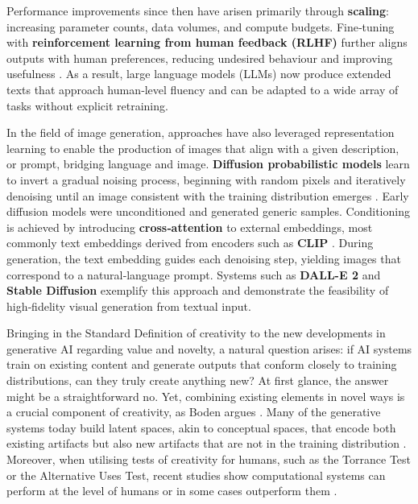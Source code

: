 Performance improvements since then have arisen primarily through \textbf{scaling}: increasing parameter counts, data volumes, and compute budgets. Fine‑tuning with \textbf{reinforcement learning from human feedback (RLHF)} further aligns outputs with human preferences, reducing undesired behaviour and improving usefulness \cite{Ouyang2022-af}. As a result, large language models (LLMs) now produce extended texts that approach human‑level fluency and can be adapted to a wide array of tasks without explicit retraining.

In the field of image generation, approaches have also leveraged representation learning to enable the production of images that align with a given description, or prompt, bridging language and image. \textbf{Diffusion probabilistic models} learn to invert a gradual noising process, beginning with random pixels and iteratively denoising until an image consistent with the training distribution emerges \cite{Sohl-Dickstein2015-sm}. Early diffusion models were unconditioned and generated generic samples. Conditioning is achieved by introducing \textbf{cross‑attention} to external embeddings, most commonly text embeddings derived from encoders such as \textbf{CLIP} \cite{Radford2021-hb}. During generation, the text embedding guides each denoising step, yielding images that correspond to a natural‑language prompt. Systems such as \textbf{DALL-E 2} \cite{Ramesh2021-xb} and \textbf{Stable Diffusion} \cite{Rombach2021-wf} exemplify this approach and demonstrate the feasibility of high‑fidelity visual generation from textual input.


Bringing in the Standard Definition of creativity to the new developments in generative AI regarding value and novelty, a natural question arises: if AI systems train on existing content and generate outputs that conform closely to training distributions, can they truly create anything new? At first glance, the answer might be a straightforward no. Yet, combining existing elements in novel ways is a crucial component of creativity, as Boden argues \cite{Boden2003-hk}. Many of the generative systems today build latent spaces, akin to conceptual spaces, that encode both existing artifacts but also new artifacts that are not in the training distribution \cite{Goodfellow2014-jz}. Moreover, when utilising tests of creativity for humans, such as the Torrance Test or the Alternative Uses Test, recent studies show computational systems can perform at the level of humans or in some cases outperform them \cite{Hubert2024-kv, Guzik2023-cl, Koivisto2023-lw}.

